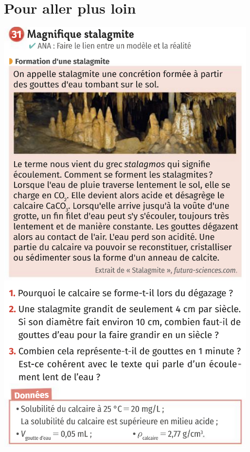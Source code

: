 \section{Pour aller plus loin}
\begin{center}
\includegraphics[scale=1.5]{Images/Chapitre_2/Ex_31.png}
\end{center}
\newpage
